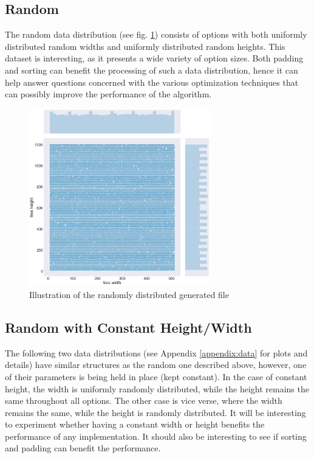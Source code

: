 \subsection{Random}
The random data distribution (see fig. \ref{fig:experimentmethodology:random}) consists of options with both uniformly distributed random widths and uniformly distributed random heights. This dataset is interesting, as it presents a wide variety of option sizes. Both padding and sorting can benefit the processing of such a data distribution, hence it can help answer questions concerned with the various optimization techniques that can possibly improve the performance of the algorithm.

\begin{figure}[H]
	\centering
	\includegraphics[width=0.7\textwidth]{img/1_RAND_plot.png}
	\caption{Illustration of the randomly distributed generated file}
	\label{fig:experimentmethodology:random}
\end{figure}

\subsection{Random with Constant Height/Width}
The following two data distributions (see Appendix \ref{appendix:data} for plots and details) have similar structures as the random one described above, however, one of their parameters is being held in place (kept constant). In the case of constant height, the width is uniformly randomly distributed, while the height remains the same throughout all options. The other case is vice verse, where the width remains the same, while the height is randomly distributed. It will be interesting to experiment whether having a constant width or height benefits the performance of any implementation. It should also be interesting to see if sorting and padding can benefit the performance. 

